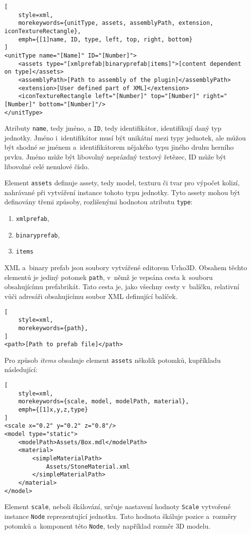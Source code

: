 \begin{lstlisting}[
	style=xml,
	morekeywords={unitType, assets, assemblyPath, extension, iconTextureRectangle},
	emph={[1]name, ID, type, left, top, right, bottom}
]
<unitType name="[Name]" ID="[Number]">
	<assets type="[xmlprefab|binaryprefab|items]">[content dependent on type]</assets>
	<assemblyPath>[Path to assembly of the plugin]</assemblyPath>
	<extension>[User defined part of XML]</extension>
	<iconTextureRectangle left="[Number]" top="[Number]" right="[Number]" bottom="[Number]"/>
</unitType>
\end{lstlisting}

Atributy \texttt{name}, tedy jméno, a \texttt{ID}, tedy identifikátor, identifikují daný typ jednotky. Jméno i~identifikátor musí být unikátní mezi typy jednotek, ale můžou být shodné se jménem a~identifikátorem nějakého typu jiného druhu herního prvku. Jméno může být libovolný neprázdný textový řetězec, ID může být libovolné celé nenulové číslo.

Element \texttt{assets} definuje assety, tedy model, texturu či tvar pro výpočet kolizí, nahrávané při vytváření instance tohoto typu jednotky. Tyto assety mohou být definovány třemi způsoby, rozlišenými hodnotou atributu \texttt{type}:

\begin{enumerate}
	\item \texttt{xmlprefab},
	\item \texttt{binaryprefab},
	\item \texttt{items}
\end{enumerate}

XML a~binary prefab jsou soubory vytvářené editorem Urho3D. Obsahem těchto elementů je jediný potomek \texttt{path}, v~němž je vepsána cesta k~souboru obsahujícímu prefabrikát. Tato cesta je, jako všechny cesty v~balíčku, relativní vůči adresáři obsahujícímu soubor XML definující balíček.

\begin{lstlisting}[
	style=xml,
	morekeywords={path},
]
<path>[Path to prefab file]</path>
\end{lstlisting}

Pro způsob \textit{items} obsahuje element \texttt{assets} několik potomků, kupříkladu následující:

\begin{lstlisting}[
	style=xml,
	morekeywords={scale, model, modelPath, material},
	emph={[1]x,y,z,type}
]
<scale x="0.2" y="0.2" z="0.8"/>
<model type="static">
	<modelPath>Assets/Box.mdl</modelPath>
	<material>
		<simpleMaterialPath>
			Assets/StoneMaterial.xml
		</simpleMaterialPath>
	</material>
</model>
\end{lstlisting}
Element \texttt{scale}, neboli škálování, určuje nastavení hodnoty \texttt{Scale} vytvořené instance \texttt{Node} reprezentující jednotku. Tato hodnota škáluje pozice a~rozměry potomků a~komponent této \texttt{Node}, tedy například rozměr 3D modelu. 

